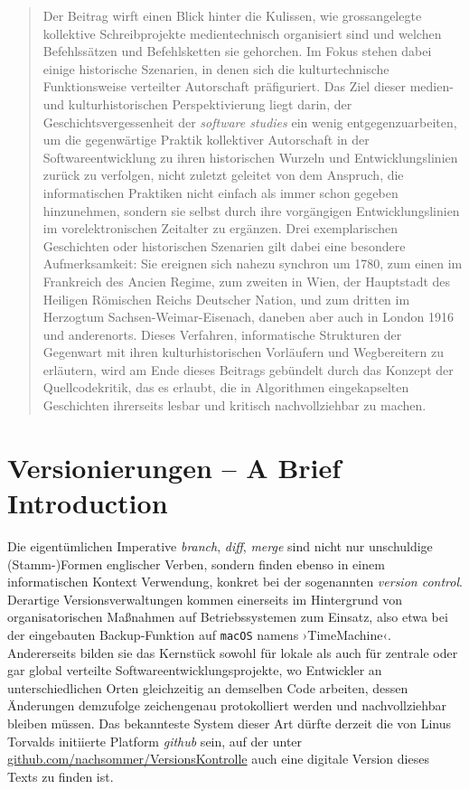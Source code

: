 \documentclass[a4paper,12pt]{article}
\newcommand{\inanf}[1]{›#1‹}
\begin{document}
\begin{abstract}
Der Beitrag wirft einen Blick hinter die Kulissen, wie grossangelegte kollektive Schreibprojekte medientechnisch organisiert sind und welchen Befehlssätzen und Befehlsketten sie gehorchen. Im Fokus stehen dabei einige historische Szenarien, in denen sich die kulturtechnische Funktionsweise verteilter Autorschaft präfiguriert. Das Ziel dieser medien- und kulturhistorischen Perspektivierung liegt darin, der Geschichtsvergessenheit der \emph{software studies} ein wenig entgegenzuarbeiten, um die gegenwärtige Praktik kollektiver Autorschaft in der Softwareentwicklung zu ihren historischen Wurzeln und Entwicklungslinien zurück zu verfolgen, nicht zuletzt geleitet von dem Anspruch, die informatischen Praktiken nicht einfach als immer schon gegeben hinzunehmen, sondern sie selbst durch ihre vorgängigen Entwicklungslinien im vorelektronischen Zeitalter zu ergänzen. Drei exemplarischen Geschichten oder historischen Szenarien gilt dabei eine besondere Aufmerksamkeit: Sie ereignen sich nahezu synchron um 1780, zum einen im Frankreich des Ancien Regime, zum zweiten in Wien, der Hauptstadt des Heiligen Römischen Reichs Deutscher Nation, und zum dritten im Herzogtum Sachsen-Weimar-Eisenach, daneben aber auch in London 1916 und anderenorts. Dieses Verfahren, informatische Strukturen der Gegenwart mit ihren kulturhistorischen Vorläufern und Wegbereitern zu erläutern, wird am Ende dieses Beitrags gebündelt durch das Konzept der Quellcodekritik, das es erlaubt, die in Algorithmen eingekapselten Geschichten ihrerseits lesbar und kritisch nachvollziehbar zu machen. 
\end{abstract}



\section{Versionierungen – A Brief Introduction}

Die eigentümlichen Imperative \emph{branch}, \emph{diff}, \emph{merge} sind nicht nur unschuldige (Stamm-)Formen englischer Verben, sondern finden ebenso in einem informatischen Kontext Verwendung, konkret bei der sogenannten \emph{version control}. Derartige Versionsverwaltungen kommen einerseits im Hintergrund von organisatorischen Maßnahmen auf Betriebssystemen zum Einsatz, also etwa bei der eingebauten Backup-Funktion auf \verb+macOS+ namens \inanf{TimeMachine}. Andererseits bilden sie das Kernstück sowohl für lokale als auch für zentrale oder gar global verteilte Softwareentwicklungsprojekte, wo Entwickler an unterschiedlichen Orten gleichzeitig an demselben Code arbeiten, dessen Änderungen demzufolge zeichengenau protokolliert werden und nachvollziehbar bleiben müssen. Das bekannteste System dieser Art dürfte derzeit die von Linus Torvalds initiierte Platform \emph{github} sein, auf der unter \href{https://github.com/nachsommer/VersionsKontrolle}{github.com/nachsommer/VersionsKontrolle} auch eine digitale Version dieses Texts zu finden ist. 
\end{document}
